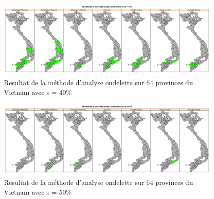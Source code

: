 \begin{figure}[h]
\includegraphics[width = \linewidth]{../figures/chap4/Pic4_8.png}
\caption{Resultat de la méthode d'analyse ondelette sur 64 provinces du Vietnam avec s = 40\%}
\label{Pic4_8}	
\end{figure}

\begin{figure}[h]
\includegraphics[width = \linewidth]{../figures/chap4/Pic4_9.png}
\caption{Resultat de la méthode d'analyse ondelette sur 64 provinces du Vietnam avec s = 50\%}
\label{Pic4_9}	
\end{figure}


